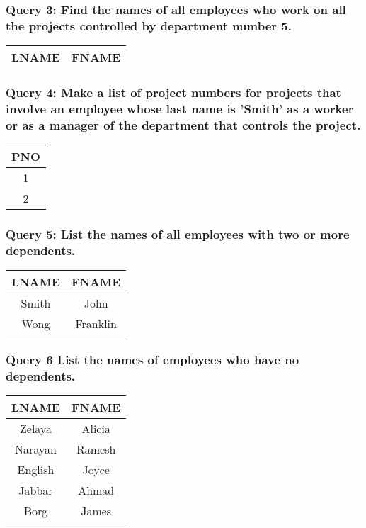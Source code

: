 \documentclass[11pt, oneside]{article}   	%
\begin{document}
\subsubsection*{Query 3: Find the names of all employees who work on all the projects controlled by department number 5.}
\begin{center}
\begin{tabular}{ c | c }
  LNAME & FNAME \\ \hline
\end{tabular}
\end{center}

\subsubsection*{Query 4: Make a list of project numbers for projects that involve an employee whose last name is 'Smith' as a worker or as a manager of the department that controls the project.}
\begin{center}
\begin{tabular}{ c }
  PNO \\ \hline
  1 \\
  2 \\
\end{tabular}
\end{center}

\subsubsection*{Query 5: List the names of all employees with two or more dependents.}
\begin{center}
\begin{tabular}{ c | c }
  LNAME & FNAME \\ \hline
  Smith & John \\
  Wong & Franklin \\
\end{tabular}
\end{center}

\subsubsection*{Query 6 List the names of employees who have no dependents.}
\begin{center}
\begin{tabular}{ c | c }
  LNAME & FNAME \\ \hline
  Zelaya & Alicia \\
  Narayan & Ramesh \\
  English & Joyce \\
  Jabbar & Ahmad \\
  Borg & James \\
\end{tabular}
\end{center}
\end{document}
